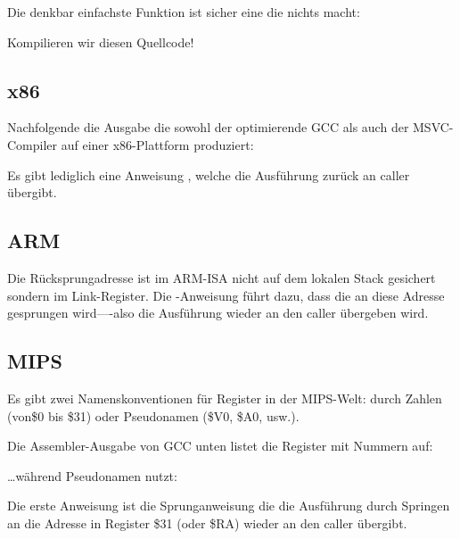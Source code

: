 \label{empty_func}

Die denkbar einfachste Funktion ist sicher eine die nichts macht:



Kompilieren wir diesen Quellcode!

\subsection{x86}
Nachfolgende die Ausgabe die sowohl der optimierende GCC als auch der MSVC-Compiler auf
einer x86-Plattform produziert:



Es gibt lediglich eine Anweisung \RET, welche die Ausführung zurück an \gls{caller} übergibt.

\subsection{ARM}


Die Rücksprungadresse ist im ARM-\ac{ISA} nicht auf dem lokalen Stack gesichert sondern im Link-Register.
Die -Anweisung führt dazu, dass die an diese Adresse gesprungen wird----also die Ausführung
wieder an den \gls{caller} übergeben wird.

\subsection{MIPS}
Es gibt zwei Namenskonventionen für Register in der MIPS-Welt:
durch Zahlen (von\$0 bis \$31) oder Pseudonamen (\$V0, \$A0, usw.).

Die Assembler-Ausgabe von GCC unten listet die Register mit Nummern auf:



\dots während \IDA Pseudonamen nutzt:



Die erste Anweisung ist die Sprunganweisung die die Ausführung durch Springen an die Adresse
in Register \$31 (oder \$RA) wieder an den \gls{caller} übergibt.


